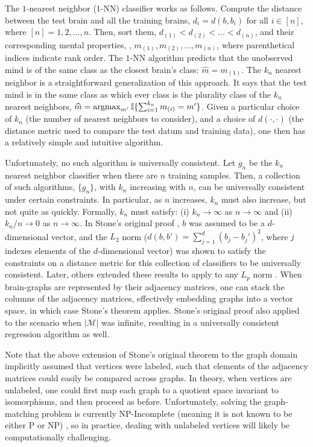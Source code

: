 \documentclass{article}
\newcommand{\conv}{\rightarrow}
\newcommand{\II}{\mathbb{I}}           %
\providecommand{\mc}[1]{\mathcal{#1}}
\providecommand{\mh}[1]{\widehat{#1}}
\newcommand{\argmax}{\operatornamewithlimits{argmax}}
\begin{document}
The $1$-nearest neighbor ($1$-NN) classifier works as follows.  Compute the distance between the test brain and all the training brains, $d_i=d(b,b_i)$ for all $i \in [n]$, where $[n]=1,2,\ldots, n$.  Then, sort them, $d_{(1)} < d_{(2)} < \ldots < d_{(n)}$, and their corresponding mental properties, , $m_{(1)}, m_{(2)}, \ldots, m_{(n)}$, where parenthetical indices indicate rank order.  %
The $1$-NN algorithm predicts that the unobserved mind is of the same class as the closest brain's class: $\mh{m}=m_{(1)}$.  The $k_n$ nearest neighbor is a straightforward generalization of this approach.  It says that the test mind is in the same class as which ever class is the plurality class of the $k_n$ nearest neighbors, $\mh{m}=\argmax_{m'}\II\{\sum_{i=1}^{k_n} m_{(i)}=m'\}$.  Given a particular choice of $k_n$ (the number of nearest neighbors to consider), and a choice of $d(\cdot,\cdot)$ (the distance metric used to compare the test datum and training data), one then has a relatively simple and intuitive algorithm.  

Unfortunately, no such algorithm is universally consistent.  Let $g_n$ be the $k_n$ nearest neighbor classifier when there are $n$ training samples.  Then, a collection of such algorithms, $\{g_n\}$,  with $k_n$ increasing with $n$, can be universally consistent under certain constraints. In particular, as $n$ increases, $k_n$ must also increase, but not quite as quickly.  Formally, $k_n$ must satisfy: (i) $k_n \conv \infty$ as $n \conv \infty$ and (ii) $k_n/n \conv 0$ as $n\conv\infty$. In Stone's original proof \cite{Stone1977}, $b$ was assumed to be a $d$-dimensional vector, and the $L_2$ norm ($d(b,b')=\sum_{j=1}^d (b_j-b_j')^2$, where $j$ indexes elements of the $d$-dimensional vector) was shown to satisfy the constraints on a distance metric for this collection of classifiers to be universally consistent.  Later, others extended these results to apply to any $L_p$ norm \cite{DGL96}.  When brain-graphs are represented by their adjacency matrices, one can stack the columns of the adjacency matrices, effectively embedding graphs into a vector space, in which case Stone's theorem applies.  Stone's original proof also applied to the scenario when $|\mc{M}|$ was infinite, resulting in a universally consistent regression algorithm as well.

Note that the above extension of Stone's original theorem to the graph domain implicitly assumed that vertices were labeled, such that elements of the adjacency matrices could easily be compared across graphs.  In theory, when vertices are unlabeled, one could first map each graph to a quotient space invariant to isomorphisms, and then proceed as before.  Unfortunately, solving the graph-matching problem is currently NP-Incomplete (meaning it is not known to be either P or NP) \cite{GareyJohnson79}, so in practice, dealing with unlabeled vertices will likely be computationally challenging.
\end{document}
